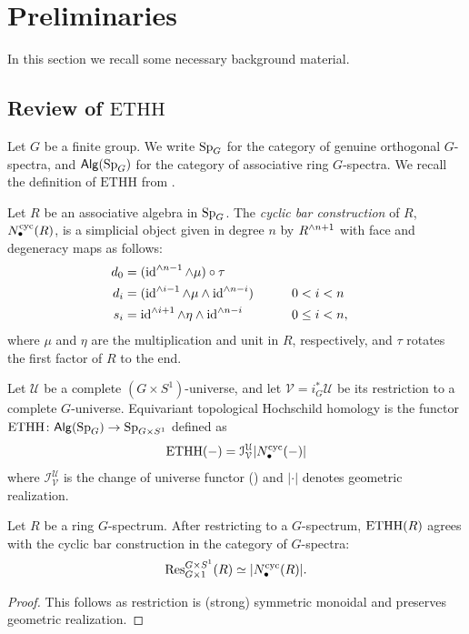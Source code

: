 \section{Preliminaries}\label{sec: prelims}
In this section we recall some necessary background material.  
\subsection{\texorpdfstring{Review of $\mathrm{ETHH}$}{Review of ETHH}}

Let $G$ be a finite group. We write $\Spg$ for the category of genuine orthogonal $G$-spectra, and $\Alg(\Spg)$ for the category of associative ring $G$-spectra. We recall the definition of $\mathrm{ETHH}$ from \cite{CGK25}.

\begin{definition}
  Let $R$ be an associative algebra in $\Spg$. The \textit{cyclic bar construction} of $R$, $N^{\mathrm{cyc}}_\bullet(R)$, is a simplicial object given in degree $n$ by $R^{\wedge n+1}$ with face and degeneracy maps as follows:
  \begin{alignat*}{3}
    d_0 &= (\operatorname{id}^{\wedge n-1} \wedge \mu) \circ \tau  \\
    d_i &= (\operatorname{id}^{\wedge i-1}\wedge \mu \wedge \operatorname{id}^{\wedge n-i}) \qquad& 0&< i<n \\
    s_i &= \operatorname{id}^{\wedge i+1} \wedge \eta \wedge \operatorname{id}^{\wedge n-i} \qquad& 0&\leq i<n, 
  \end{alignat*}
  where $\mu$ and $\eta$ are the multiplication and unit in $R$, respectively, and $\tau$ rotates the first factor of $R$ to the end.
\end{definition}

\begin{definition}
  Let $\mathcal{U}$ be a complete $(G\times S^1)$-universe, and let $\mathcal{V} = i^*_G\mathcal{U}$ be its restriction to a complete $G$-universe.
  Equivariant topological Hochschild homology is the functor $\ETHH\colon\Alg(\Spg) \to \Spg[G\times S^1]$ defined as
  \[ \mathrm{ETHH}(-) = \mathcal{I}^{\mathcal{U}}_{\mathcal{V}}|N^{\mathrm{cyc}}_\bullet(-)| \]
  where $\mathcal{I}^{\mathcal{U}}_{\mathcal{V}}$ is the change of universe functor (\cite[Section II.1]{LMSM}) and $| \cdot |$ denotes geometric realization.
\end{definition}

\begin{proposition}
    \label{ETHHisCyclicBar}
  Let $R$ be a ring $G$-spectrum. After restricting to a $G$-spectrum, $\mathrm{ETHH}(R)$ agrees with the cyclic bar construction in the category of $G$-spectra:
  \[ \operatorname{Res}^{G\times S^1}_{G\times 1}(R) \simeq |N^{\mathrm{cyc}}_\bullet(R)|. \]
\end{proposition}
\begin{proof}
  This follows as restriction is (strong) symmetric monoidal and preserves geometric realization.
\end{proof}


